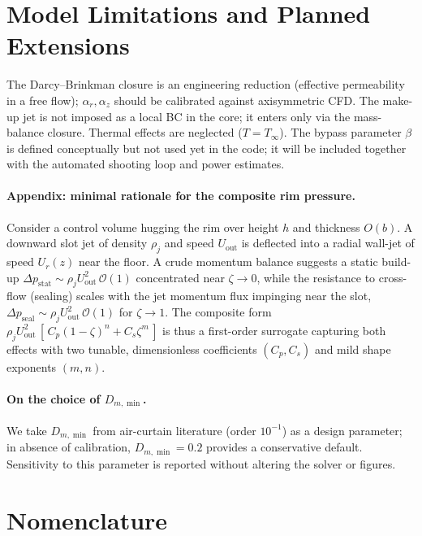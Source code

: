 \documentclass[11pt,a4paper]{article}
\begin{document}
\section{Model Limitations and Planned Extensions}
\label{sec:model-limitations-and-planned-extensions}

The Darcy--Brinkman closure is an engineering reduction (effective permeability in a
free flow); $\alpha_r,\alpha_z$ should be calibrated against axisymmetric CFD.
The make-up jet is not imposed as a local BC in the core; it enters only via the
mass-balance closure. Thermal effects are neglected ($T=T_\infty$). The bypass parameter
$\beta$ is defined conceptually but not used yet in the code; it will be included together
with the automated shooting loop and power estimates.

\paragraph{Appendix: minimal rationale for the composite rim pressure.}
Consider a control volume hugging the rim over height $h$ and thickness $O(b)$.
A downward slot jet of density $\rho_j$ and speed $U_{\mathrm{out}}$ is deflected
into a radial wall-jet of speed $U_r(z)$ near the floor. A crude momentum balance
suggests a static build-up $\Delta p_{\mathrm{stat}}\sim \rho_j U_{\mathrm{out}}^2
\,\mathcal{O}(1)$ concentrated near $\zeta\!\to\!0$, while the resistance to
cross-flow (sealing) scales with the jet momentum flux impinging near the slot,
$\Delta p_{\mathrm{seal}}\sim \rho_j U_{\mathrm{out}}^2\,\mathcal{O}(1)$ for
$\zeta\!\to\!1$. The composite form
$\rho_j U_{\mathrm{out}}^2\,[\,C_p(1-\zeta)^n + C_s \zeta^m\,]$ is thus a
first-order surrogate capturing both effects with two tunable, dimensionless
coefficients $(C_p,C_s)$ and mild shape exponents $(m,n)$.

\paragraph{On the choice of $D_{m,\min}$.}
We take $D_{m,\min}$ from air-curtain literature (order $10^{-1}$) as a design parameter; in absence of calibration, $D_{m,\min}=0.2$ provides a conservative default.
Sensitivity to this parameter is reported without altering the solver or figures.

\section{Nomenclature}
\label{sec:nomenclature}
\end{document}

